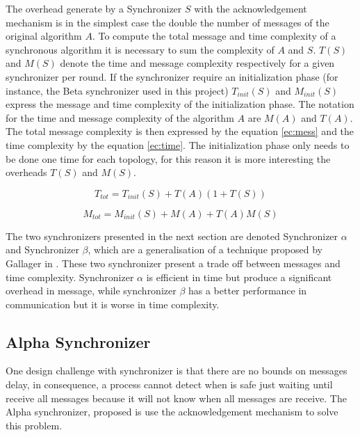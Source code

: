 The  overhead generate by a Synchronizer $S$ with the acknowledgement mechanism is in the simplest case the double the number of messages of the original algorithm $A$. To compute the total message and time complexity of a synchronous algorithm it is necessary to sum the complexity of $A$ and $S$. $T(S)$ and $M(S)$ denote the time and message complexity respectively for a given synchronizer per round. If the synchronizer require an initialization phase (for instance, the Beta synchronizer used in this project) $T_{init}(S)$ and $M_{init}(S)$ express the message and time complexity of the initialization phase. The notation for the time and message complexity of the algorithm $A$ are $M(A)$ and $T(A)$. The total message complexity is then expressed by the equation \ref{ec:mess} and the time complexity by the equation \ref{ec:time}. The initialization phase only needs to be done one time for each topology, for this reason it is more interesting the overheads $T(S)$ and $M(S)$.


\begin{equation}
\label{ec:mess}
 T_{tot} = T_{init}(S) + T(A)(1+T(S)) 
\end{equation}

\begin{equation}
\label{ec:time}
M_{tot} = M_{init}(S) + M(A) + T(A)M(S) 
\end{equation}


The two synchronizers presented in the next section are denoted Synchronizer $\alpha$ and Synchronizer $\beta$, which are a generalisation of a technique proposed by Gallager in \cite{gallager1982distributed}. These two synchronizer present a trade off between messages and time complexity. Synchronizer $\alpha$ is efficient in time but produce a significant overhead in message, while synchronizer $\beta$ has a better performance in communication but it is worse in time complexity.  



\subsection{Alpha Synchronizer}

One design challenge with synchronizer is that there are no bounds on messages delay, in consequence, a process cannot detect when is safe just waiting until receive all messages because it will not know when all messages are receive. The Alpha synchronizer, proposed is \cite{awerbuch1985complexity} use the acknowledgement mechanism to solve this problem. 

